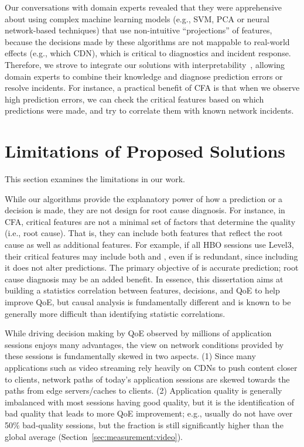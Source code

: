 Our conversations with domain experts revealed that they 
were apprehensive about using complex machine learning 
models (e.g., SVM, PCA or neural network-based techniques) that 
use non-intuitive ``projections''  of features, because the decisions made by 
these algorithms are not mappable to real-world effects (e.g., which CDN), 
which is critical to diagnostics and incident response.
Therefore, we strove to integrate our solutions with
interpretability~\cite{vellido2012making}, 
allowing domain experts to combine
their knowledge and diagnose prediction
errors or resolve incidents.
For instance, a practical benefit of CFA is that when we observe
high prediction errors, we can check the critical features
based on which predictions were made, and try to correlate them 
with known network incidents.


\section{Limitations of Proposed Solutions}
\label{sec:concl:limitations}

This section examines the limitations in our work.

While our algorithms provide the explanatory power of how a 
prediction or a decision is made, they are not design for 
root cause diagnosis.
For instance, in CFA, critical features are not a minimal set of
factors that determine the quality (i.e., root cause).
That is, they can include both features that reflect
the root cause as well as additional features.
For example, if all HBO sessions use Level3, their
critical features may include both \fCDN and \fSite,
even if \fCDN is redundant, since including it does
not alter predictions.
The primary objective of \dda is accurate prediction;
root cause diagnosis may be an added benefit.
In essence, this dissertation aims at building a 
statistics correlation between features, decisions,
and QoE to help improve QoE, but causal analysis is 
fundamentally different and is known to be generally
more difficult than identifying statistic correlations.

While driving decision making by QoE observed by
millions of application sessions enjoys many advantages, 
the view on network conditions provided by these sessions
is fundamentally skewed in two aspects.
(1) Since many applications  such as video streaming rely
heavily on CDNs to push content closer to clients, 
network paths of today's application sessions are skewed 
towards the paths from edge servers/caches to clients.
(2) Application quality is generally imbalanced with most 
sessions having good quality, but it is the identification of bad quality 
that leads to more QoE improvement; 
e.g., \problemclusters usually do not have over 50\% bad-quality 
sessions, but the fraction is still significantly higher than the 
global average (Section~\ref{sec:measurement:video}).


